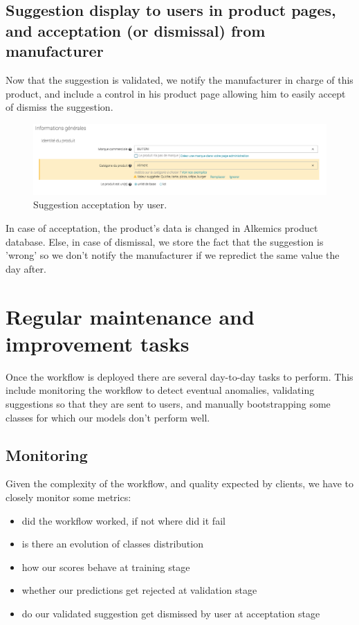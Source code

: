 \subsection{Suggestion display to users in product pages, and acceptation (or dismissal) from manufacturer}

Now that the suggestion is validated, we notify the manufacturer in charge of this product, and include a control in his product page allowing him to easily accept of dismiss the suggestion.

\begin{figure}[H]
\centering
\includegraphics[scale=0.35]{./images/workflow/stream-suggestion-3.png}
\caption{Suggestion acceptation by user.}
\end{figure}

In case of acceptation, the product's data is changed in Alkemics product database. Else, in case of dismissal, we store the fact that the suggestion is 'wrong' so we don't notify the manufacturer if we repredict the same value the day after.


\pagebreak
\section{Regular maintenance and improvement tasks}

Once the workflow is deployed there are several day-to-day tasks to perform. This include monitoring the workflow to detect eventual anomalies, validating suggestions so that they are sent to users, and manually bootstrapping some classes for which our models don't perform well.

\subsection{Monitoring}

Given the complexity of the workflow, and quality expected by clients, we have to closely monitor some metrics:
\begin{itemize}
	\item did the workflow worked, if not where did it fail
	\item is there an evolution of classes distribution
	\item how our scores behave at training stage
	\item whether our predictions get rejected at validation stage
	\item do our validated suggestion get dismissed by user at acceptation stage
\end{itemize}


